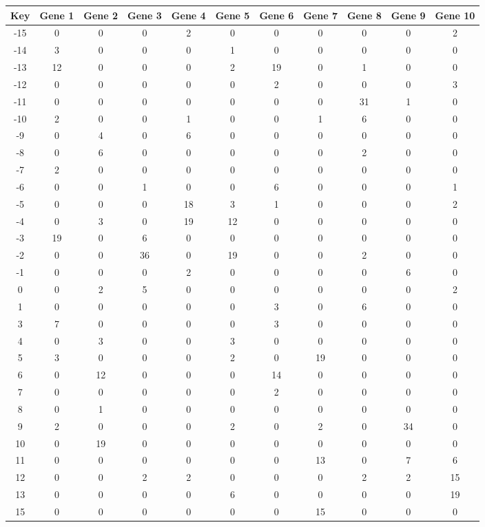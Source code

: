 \begin{tabular}{|c|c|c|c|c|c|c|c|c|c|c|}
\hline
Key & Gene 1 & Gene 2 & Gene 3 & Gene 4 & Gene 5 & Gene 6 & Gene 7 & Gene 8 & Gene 9 & Gene 10 \\
\hline
-15 & 0 & 0 & 0 & 2 & 0 & 0 & 0 & 0 & 0 & 2 \\
-14 & 3 & 0 & 0 & 0 & 1 & 0 & 0 & 0 & 0 & 0 \\
-13 & 12 & 0 & 0 & 0 & 2 & 19 & 0 & 1 & 0 & 0 \\
-12 & 0 & 0 & 0 & 0 & 0 & 2 & 0 & 0 & 0 & 3 \\
-11 & 0 & 0 & 0 & 0 & 0 & 0 & 0 & 31 & 1 & 0 \\
-10 & 2 & 0 & 0 & 1 & 0 & 0 & 1 & 6 & 0 & 0 \\
-9 & 0 & 4 & 0 & 6 & 0 & 0 & 0 & 0 & 0 & 0 \\
-8 & 0 & 6 & 0 & 0 & 0 & 0 & 0 & 2 & 0 & 0 \\
-7 & 2 & 0 & 0 & 0 & 0 & 0 & 0 & 0 & 0 & 0 \\
-6 & 0 & 0 & 1 & 0 & 0 & 6 & 0 & 0 & 0 & 1 \\
-5 & 0 & 0 & 0 & 18 & 3 & 1 & 0 & 0 & 0 & 2 \\
-4 & 0 & 3 & 0 & 19 & 12 & 0 & 0 & 0 & 0 & 0 \\
-3 & 19 & 0 & 6 & 0 & 0 & 0 & 0 & 0 & 0 & 0 \\
-2 & 0 & 0 & 36 & 0 & 19 & 0 & 0 & 2 & 0 & 0 \\
-1 & 0 & 0 & 0 & 2 & 0 & 0 & 0 & 0 & 6 & 0 \\
0 & 0 & 2 & 5 & 0 & 0 & 0 & 0 & 0 & 0 & 2 \\
1 & 0 & 0 & 0 & 0 & 0 & 3 & 0 & 6 & 0 & 0 \\
3 & 7 & 0 & 0 & 0 & 0 & 3 & 0 & 0 & 0 & 0 \\
4 & 0 & 3 & 0 & 0 & 3 & 0 & 0 & 0 & 0 & 0 \\
5 & 3 & 0 & 0 & 0 & 2 & 0 & 19 & 0 & 0 & 0 \\
6 & 0 & 12 & 0 & 0 & 0 & 14 & 0 & 0 & 0 & 0 \\
7 & 0 & 0 & 0 & 0 & 0 & 2 & 0 & 0 & 0 & 0 \\
8 & 0 & 1 & 0 & 0 & 0 & 0 & 0 & 0 & 0 & 0 \\
9 & 2 & 0 & 0 & 0 & 2 & 0 & 2 & 0 & 34 & 0 \\
10 & 0 & 19 & 0 & 0 & 0 & 0 & 0 & 0 & 0 & 0 \\
11 & 0 & 0 & 0 & 0 & 0 & 0 & 13 & 0 & 7 & 6 \\
12 & 0 & 0 & 2 & 2 & 0 & 0 & 0 & 2 & 2 & 15 \\
13 & 0 & 0 & 0 & 0 & 6 & 0 & 0 & 0 & 0 & 19 \\
15 & 0 & 0 & 0 & 0 & 0 & 0 & 15 & 0 & 0 & 0 \\
\hline
\end{tabular}